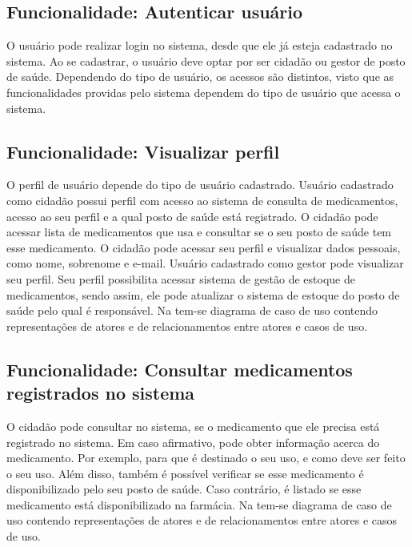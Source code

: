 \subsection{Funcionalidade: Autenticar usuário}

O usuário pode realizar login no sistema, desde que ele já esteja cadastrado no sistema. Ao se cadastrar, o usuário deve optar por ser cidadão ou gestor de posto de saúde. Dependendo do tipo de usuário, os acessos são distintos, visto que as funcionalidades providas pelo sistema dependem do tipo de usuário que acessa o sistema.

\subsection{Funcionalidade: Visualizar perfil}

O perfil de usuário depende do tipo de usuário cadastrado. Usuário  cadastrado como cidadão possui perfil com acesso ao sistema de consulta de medicamentos, acesso ao seu perfil e a qual posto de saúde está registrado. O cidadão pode acessar lista de medicamentos que usa e consultar se o seu posto de saúde tem esse medicamento. O cidadão pode acessar seu perfil e visualizar dados pessoais, como nome, sobrenome e e-mail. Usuário cadastrado como gestor pode visualizar seu perfil. Seu perfil possibilita acessar sistema de gestão de estoque de medicamentos, sendo assim, ele pode atualizar o sistema de estoque do posto de saúde pelo qual é responsável. Na  tem-se diagrama de caso de uso contendo representações de atores e de relacionamentos entre atores e casos de uso.


%

\subsection{Funcionalidade: Consultar medicamentos registrados no sistema}

O cidadão pode consultar no sistema, se o medicamento que ele precisa está registrado no sistema. Em caso afirmativo,  pode obter informação acerca do medicamento. Por exemplo, para que é destinado o seu uso, e como deve ser feito o seu uso. Além disso, também é possível verificar se esse medicamento é disponibilizado pelo seu posto de saúde. Caso contrário, é listado se esse medicamento está disponibilizado na farmácia. Na  tem-se diagrama de caso de uso contendo representações de atores e de relacionamentos entre atores e casos de uso.


